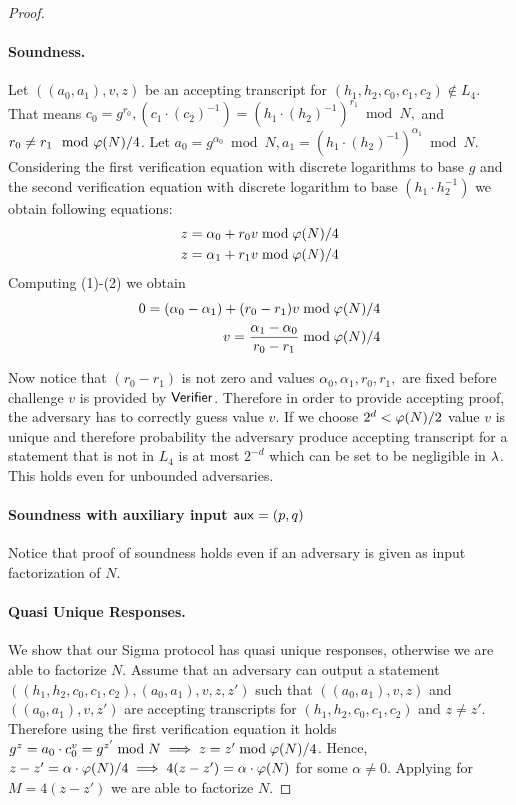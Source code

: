 \begin{proof}
\paragraph{Soundness.} Let $((a_0, a_1), v, z)$ be an accepting transcript for $(h_1, h_2, c_0, c_1, c_2) \notin L_4$. That means $c_0 = g^{r_0}, (c_1\cdot (c_2)^{-1}) = (h_1\cdot (h_2)^{-1})^{r_1} \bmod N,$ and $r_0 \neq r_1 \mod {\varphi(N)/4}$. Let $a_0 = g^{\alpha_0} \bmod N, a_1 = (h_1\cdot (h_2)^{-1})^{\alpha_1} \bmod N$. Considering the first verification equation with discrete logarithms to base $g$ and the second verification equation with discrete logarithm to base $(h_1 \cdot h_2^{-1})$ we obtain following equations:
\begin{align}
z = \alpha_0 + r_0 v \bmod \varphi(N)/4\\
z = \alpha_1 + r_1 v \bmod \varphi(N)/4 \\
\end{align}
Computing (1)-(2) we obtain
\begin{align*}
0 = (\alpha_0 - \alpha_1)+ (r_0-r_1)v \bmod \varphi(N)/4 \\
v = \frac{\alpha_1 - \alpha_0}{r_0-r_1} \bmod \varphi(N)/4
\end{align*}

Now notice that $(r_0 - r_1)$ is not zero and values $\alpha_0, \alpha_1, r_0, r_1, $ are fixed before challenge $v$ is provided by $\mathsf{Verifier}$. Therefore in order to provide accepting proof, the adversary has to correctly guess value $v$. If we choose $2^d < \varphi(N)/2$ value $v$ is unique and therefore probability the adversary produce accepting transcript for a statement that is not in $L_4$ is at most $2^{-d}$ which can be set to be negligible in $\lambda$. This holds even for unbounded adversaries. 

\paragraph{Soundness with auxiliary input $\mathsf{aux} = (p,q)$} Notice that proof of soundness holds even if an adversary is given as input factorization of $N$.

\paragraph{Quasi Unique Responses.} We show that our Sigma protocol has quasi unique responses, otherwise we are able to factorize $N$. Assume that an adversary can output a statement $((h_1, h_2, c_0, c_1, c_2), (a_0, a_1), v, z, z')$ such that $((a_0, a_1), v, z)$ and $((a_0, a_1), v, z')$ are accepting transcripts for $(h_1, h_2, c_0, c_1, c_2)$ and $z \neq z'$. Therefore using the first verification equation it holds $g^z = a_0 \cdot c_0^v = g^{z'} \bmod N \implies z = z' \bmod \varphi(N)/4$. Hence, $z-z' = \alpha \cdot \varphi(N)/4 \implies 4(z-z') = \alpha \cdot \varphi(N) $ for some $\alpha \neq 0$. Applying  for $M=4(z-z')$ we are able to factorize $N$.
\end{proof}

